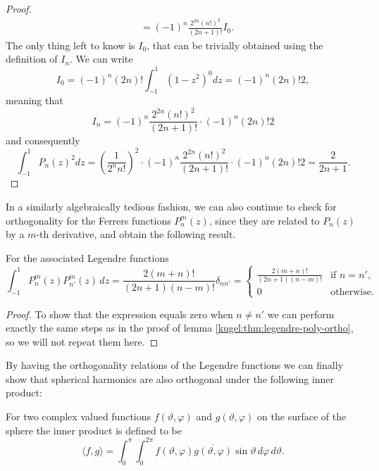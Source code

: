 \begin{proof}
\begin{align*}
    &= (-1)^n  \frac{2^{2n}(n!)^2}{(2n+1)!} I_0 .
  \end{align*}
  The only thing left to know is $I_0$, that can be trivially obtained using the definition of $I_n$. We can write
  \begin{equation*}
    I_0 = (-1)^n(2n)! \int_{-1}^1 (1-z^2)^0 dz = (-1)^n(2n)! 2,
  \end{equation*}
  meaning that
  \begin{equation*}
    I_n = (-1)^n  \frac{2^{2n}(n!)^2}{(2n+1)!} \cdot (-1)^n(2n)! 2
  \end{equation*}
  and consequently
  \begin{equation*}
      \int_{-1}^1 P_n(z)^2 dz = \left( \frac{1}{2^n n!} \right)^2 \cdot (-1)^n  \frac{2^{2n}(n!)^2}{(2n+1)!} \cdot (-1)^n(2n)! 2 = \frac{2}{2n+1}.
  \end{equation*}

\end{proof}

In a similarly algebraically tedious fashion, we can also continue to check for
orthogonality for the Ferrers functions $P^m_n(z)$, since they are related to
$P_n(z)$ by a $m$-th derivative, and obtain the following result.

\begin{lemma} For the associated Legendre functions
  \label{kugel:thm:associated-legendre-ortho}
  \begin{equation*}
    \int_{-1}^1 P^m_n(z) P^{m}_{n'}(z) \, dz
    = \frac{2(m + n)!}{(2n + 1)(n - m)!} \delta_{nn'}
    = \begin{cases}
      \frac{2(m + n)!}{(2n + 1)(n - m)!}
        & \text{if } n = n', \\
      0 & \text{otherwise}.
    \end{cases}
  \end{equation*}
\end{lemma}
\begin{proof}
  To show that the expression equals zero when $n \neq n'$ we can perform
  exactly the same steps as in the proof of lemma
  \ref{kugel:thm:legendre-poly-ortho}, so we will not repeat them here.
\end{proof}

By having the orthogonality relations of the Legendre functions we can finally
show that spherical harmonics are also orthogonal under the following inner
product:

\begin{definition}
  \label{kugel:def:inner-product-s2}
  For two complex valued functions $f(\vartheta, \varphi)$ and $g(\vartheta,
  \varphi)$ on the surface of the sphere the inner product is defined to be
  \begin{equation*}
    \langle f, g \rangle
    = \int_{0}^\pi \int_0^{2\pi}
      f(\vartheta, \varphi) \overline{g(\vartheta, \varphi)}
      \sin \vartheta \, d\varphi \, d\vartheta.
  \end{equation*}
\end{definition}


